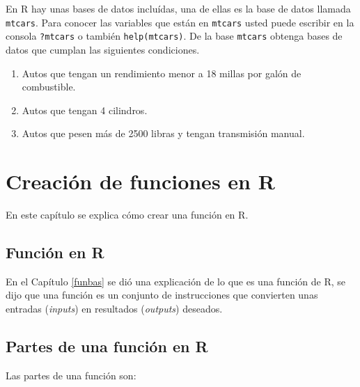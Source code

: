 \documentclass[10pt,]{krantz}
\providecommand{\tightlist}{%
  \setlength{\itemsep}{0pt}\setlength{\parskip}{0pt}}
\let\proglang=\textsf
\begin{document}
En \proglang{R} hay unas bases de datos incluídas, una de ellas es la
base de datos llamada \texttt{mtcars}. Para conocer las variables que
están en \texttt{mtcars} usted puede escribir en la consola
\texttt{?mtcars} o también \texttt{help(mtcars)}. De la base
\texttt{mtcars} obtenga bases de datos que cumplan las siguientes
condiciones.

\begin{enumerate}
\def\labelenumi{\arabic{enumi}.}
\setcounter{enumi}{21}
\tightlist
\item
  Autos que tengan un rendimiento menor a 18 millas por galón de
  combustible.
\item
  Autos que tengan 4 cilindros.
\item
  Autos que pesen más de 2500 libras y tengan transmisión manual.
\end{enumerate}

\chapter{\texorpdfstring{Creación de funciones en
\proglang{R}}{Creación de funciones en }}\label{creacion-de-funciones-en}

En este capítulo se explica cómo crear una función en \proglang{R}.

\section{\texorpdfstring{Función en \proglang{R}
}{Función en  }}\label{funcion-en}

En el Capítulo \ref{funbas} se dió una explicación de lo que es una
función de \proglang{R}, se dijo que una función es un conjunto de
instrucciones que convierten unas entradas (\emph{inputs}) en resultados
(\emph{outputs}) deseados.

\section{\texorpdfstring{Partes de una función en \proglang{R}
}{Partes de una función en  }}\label{partes-de-una-funcion-en}

Las partes de una función son:
\end{document}
